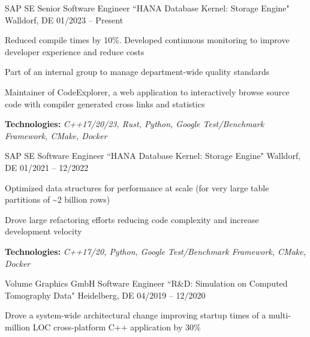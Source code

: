 \vspace{-2.0mm}
\begin{cventries}
  \cventry
    {SAP SE}
    {Senior Software Engineer ``HANA Database Kernel: Storage Engine"}
    {Walldorf, DE}
    {01/2023 -- Present}
    {
      \begin{cvitems}
        \item {Reduced compile times by 10\%. Developed continuous monitoring to improve developer experience and reduce costs}
        \item {Part of an internal group to manage department-wide quality standards}
        \item {Maintainer of CodeExplorer, a web application to interactively browse source code with compiler generated cross links and statistics}
        \item {\textbf{Technologies:} \textit{C++17/20/23, Rust, Python, Google Test/Benchmark Framework, CMake, Docker}}
      \end{cvitems}
    }
  \cventry
    {SAP SE}
    {Software Engineer ``HANA Database Kernel: Storage Engine"}
    {Walldorf, DE}
    {01/2021 -- 12/2022}
    {
      \begin{cvitems}
        \item {Optimized data structures for performance at scale (for very large table partitions of \textasciitilde 2 billion rows)}
        \item {Drove large refactoring efforts reducing code complexity and increase development velocity}
        \item {\textbf{Technologies:} \textit{C++17/20, Python, Google Test/Benchmark Framework, CMake, Docker}}
      \end{cvitems}
    }
  \cventry
    {Volume Graphics GmbH}
    {Software Engineer ``R\&D: Simulation on Computed Tomography Data"}
    {Heidelberg, DE}
    {04/2019 -- 12/2020}
    {
      \begin{cvitems}
        \item {Drove a system-wide architectural change improving startup times of a multi-million LOC cross-platform C++ application by 30\%}

\end{cvitems}}
\end{cventries}
